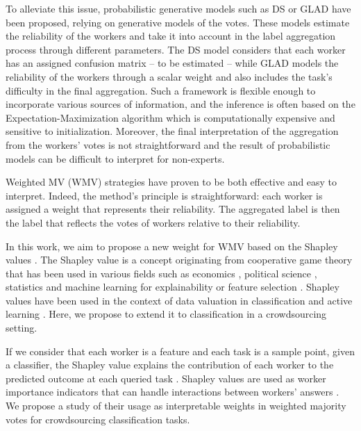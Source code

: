 \documentclass{cap2024}
\begin{document}
To alleviate this issue, probabilistic generative models such as DS \citep{dawid_maximum_1979} or GLAD \citep{whitehill_whose_2009} have been proposed, relying on generative models of the votes.
These models estimate the reliability of the workers and take it into account in the label aggregation process through different parameters. The DS model considers that each worker has an assigned confusion matrix -- to be estimated -- while GLAD models the reliability of the workers through a scalar weight and also includes the task's difficulty in the final aggregation.
Such a framework is flexible enough to incorporate various sources of information, and the inference is often based on the Expectation-Maximization algorithm which is computationally expensive and sensitive to initialization.
Moreover, the final interpretation of the aggregation from the workers' votes is not straightforward and the result of probabilistic models can be difficult to interpret for non-experts.

Weighted MV (WMV) strategies \citep{appen_wawa_2021,karger2011iterative,ma2020adversarial} have proven to be both effective and easy to interpret. Indeed, the method's principle is straightforward: each worker is assigned a weight that represents their reliability. The aggregated label is then the label that reflects the votes of workers relative to their reliability.

In this work, we aim to propose a new weight for WMV based on the Shapley values \citep{shapley1953value}.
The Shapley value is a concept originating from cooperative game theory that has been used in various fields such as economics \citep{aumann1994economic}, political science \citep{engelbrecht2009use}, statistics \citep{owen2014sobol} and machine learning for explainability \citep{lundberg2017unified} or feature selection \citep{cohen2007feature}.
Shapley values have been used in the context of data valuation in classification \citep{schoch2022cs} and active learning \citep{ghorbani2022data}. Here, we propose to extend it to classification in a crowdsourcing setting.

If we consider that each worker is a feature and each task is a sample point, given a classifier, the Shapley value explains the contribution of each worker to the predicted outcome at each queried task \citep{molnar2020interpretable}.
Shapley values are used as worker importance indicators that can handle interactions between workers' answers \citep{owen2017shapley,lundberg2017unified}.
We propose a study of their usage as interpretable weights in weighted majority votes for crowdsourcing classification tasks.
\end{document}
